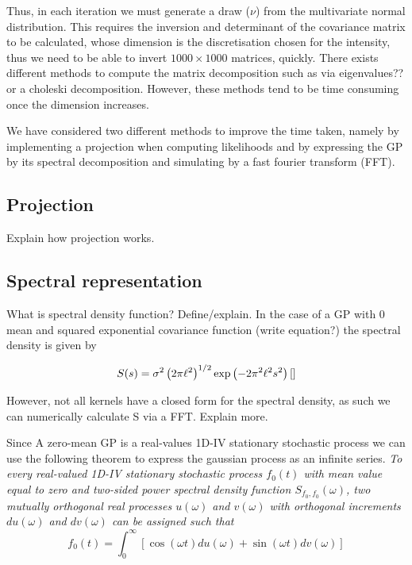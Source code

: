 \documentclass[../main.tex]{subfiles}
\begin{document}
Thus, in each iteration we must generate a draw ($\nu$) from the multivariate normal distribution. This requires the inversion and determinant of the covariance matrix to be calculated, whose dimension is the discretisation chosen for the intensity, thus we need to be able to invert $1000 \times 1000$ matrices, quickly. There exists different methods to compute the matrix decomposition such as via eigenvalues?? or a choleski decomposition. However, these methods tend to be time consuming once the dimension increases. 

We have considered two different methods to improve the time taken, namely by implementing a projection when computing likelihoods and by expressing the GP by its spectral decomposition and simulating by a fast fourier transform (FFT). 

\subsection{Projection}
Explain how projection works.

\subsection{Spectral representation}
What is spectral density function? Define/explain.
In the case of a GP with 0 mean and squared exponential covariance function (write equation?) the spectral density is given by

$$
S(s) = \sigma^2 \left( 2 \pi \ell^2 \right)^{1/2}\exp \left( -2 \pi^2 \ell^2 s^2 \right) \cite{}
$$

However, not all kernels have a closed form for the spectral density, as such we can numerically calculate S via a FFT. Explain more. 


Since A zero-mean GP is a real-values 1D-IV stationary stochastic process we can use the following theorem to express the gaussian process as an infinite series. 
{\it To every real-valued 1D-IV stationary stochastic process $f_0(t)$ with mean value equal to zero and two-sided power spectral density function $S_{f_0,f_0}(\omega)$, two mutually orthogonal real processes $u(\omega)$ and $v(\omega)$ with orthogonal increments $du(\omega)$ and $dv(\omega)$ can be assigned such that
$$
f_0(t) = \int^\infty_0 \left[\cos (\omega t)du(\omega) + \sin (\omega t)dv(\omega)  \right]
$$}
\end{document}
